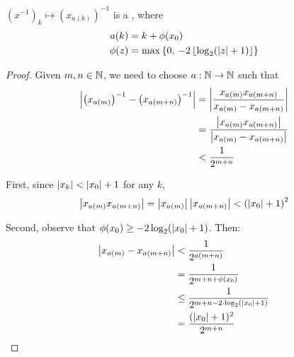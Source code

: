 \documentclass[leqno]{report}
\begin{document}
\begin{Proposition}[Reciprocal]
    $\left(x^{-1}\right)_k \mapsto \left(x_{a(k)}\right)^{-1}$ is a \FCCS, where
    \begin{align*}
        a(k) &= k + \phi(x_0) \\
        \phi(z) &= \max \left\{  0,\, -2 \left\lfloor \log_2(\left| z \right| + 1) \right\rfloor  \right\}
    \end{align*}
\end{Proposition}

\begin{proof}
    Given $m, n \in \mathbb{N}$, we need to choose $a : \mathbb{N} \rightarrow \mathbb{N}$ such that
    \begin{align*}
        \left| \left(x_{a(m)}\right)^{-1} - \left(x_{a(m+n)}\right)^{-1} \right|
        &= \left| \frac{x_{a(m)} x_{a(m+n)}}{x_{a(m)} - x_{a(m+n)}} \right| \\
        &= \frac{\left| x_{a(m)} x_{a(m+n)} \right|}{\left| x_{a(m)} - x_{a(m+n)} \right|} \\
        &< \frac{1}{2^{m+n}}
    \end{align*}

    First, since $\left| x_k \right| < \left| x_0 \right| + 1$ for any $k$,
    \[ \left| x_{a(m)} x_{a(m+n)} \right| = \left| x_{a(m)} \right| \left| x_{a(m+n)} \right| < \left(\left| x_0 \right| + 1\right)^2 \]

    Second, observe that $\phi(x_0) \geq -2 \log_2(\left| x_0 \right| + 1)$. Then:
    \begin{align*}
        \left| x_{a(m)} - x_{a(m+n)} \right|
        &< \frac{1}{2^{a(m+n)}} \\
        &= \frac{1}{2^{m + n + \phi(x_0)}} \\
        &\leq \frac{1}{2^{m + n - 2 \cdot \log_2(\left| x_0 \right| + 1)}} \\
        &= \frac{(\left| x_0 \right| + 1)^2}{2^{m+n}}
    \end{align*}
\end{proof}



\end{document}
